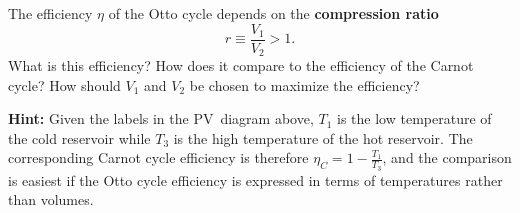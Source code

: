 \documentclass[12 pt]{article} %
\begin{document}
The efficiency $\eta$ of the Otto cycle depends on the \textbf{compression ratio}
\begin{equation*}
  r \equiv \frac{V_1}{V_2} > 1.
\end{equation*}
What is this efficiency?
How does it compare to the efficiency of the Carnot cycle?
How should $V_1$ and $V_2$ be chosen to maximize the efficiency?

\textbf{Hint:} Given the labels in the PV~diagram above, $T_1$ is the low temperature of the cold reservoir while $T_3$ is the high temperature of the hot reservoir.
The corresponding Carnot cycle efficiency is therefore $\eta_C = 1 - \frac{T_1}{T_3}$, and the comparison is easiest if the Otto cycle efficiency is expressed in terms of temperatures rather than volumes.
\end{document}
